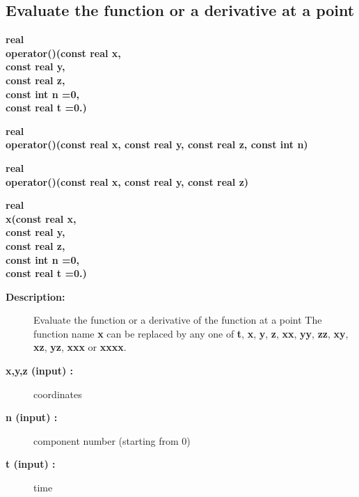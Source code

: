 \subsection{Evaluate the function or a derivative at a point}
 
\newlength{\OGFunctionIncludeArgIndent}
\begin{flushleft} \textbf{%
real  \\ 
\settowidth{\OGFunctionIncludeArgIndent}{operator()(}%
operator()(const real x, \\ 
\hspace{\OGFunctionIncludeArgIndent}const real y, \\ 
\hspace{\OGFunctionIncludeArgIndent}const real z, \\ 
\hspace{\OGFunctionIncludeArgIndent}const int n  =0, \\ 
\hspace{\OGFunctionIncludeArgIndent}const real t  =0.)
}\end{flushleft}

 
\begin{flushleft} \textbf{%
real  \\ 
\settowidth{\OGFunctionIncludeArgIndent}{operator()(}%
operator()(const real x, const real y, const real z, const int n)
}\end{flushleft}

 
\begin{flushleft} \textbf{%
real  \\ 
\settowidth{\OGFunctionIncludeArgIndent}{operator()(}%
operator()(const real x, const real y, const real z)
}\end{flushleft}

 
\begin{flushleft} \textbf{%
real  \\ 
\settowidth{\OGFunctionIncludeArgIndent}{x(}%
x(const real x, \\ 
\hspace{\OGFunctionIncludeArgIndent}const real y, \\ 
\hspace{\OGFunctionIncludeArgIndent}const real z, \\ 
\hspace{\OGFunctionIncludeArgIndent}const int n  =0, \\ 
\hspace{\OGFunctionIncludeArgIndent}const real t  =0.)
}\end{flushleft}
\begin{description}
\item[{\bf Description:}]  Evaluate the function or a derivative of the function at a point
    The function name {\bf x} can be replaced by any one of {\bf t}, {\bf x}, {\bf y}, {\bf z}, {\bf xx},
     {\bf yy}, {\bf zz}, {\bf xy}, {\bf xz}, {\bf yz}, {\bf xxx} or {\bf xxxx}.
\item[{\bf x,y,z (input) :}]  coordinates
\item[{\bf n (input) :}]  component number (starting from 0)
\item[{\bf t (input) :}]  time
\end{description}

